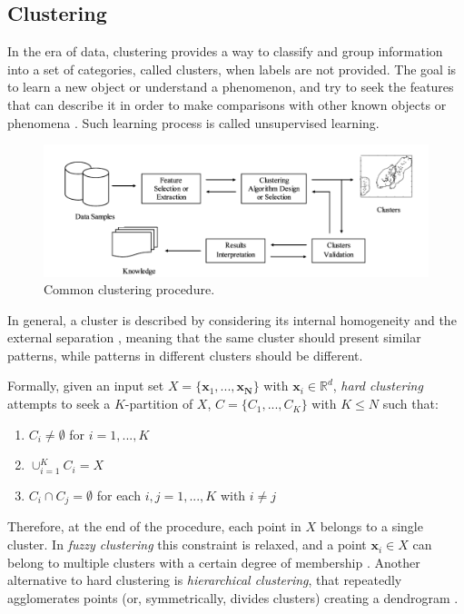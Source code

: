 \documentclass[a4paper, 12pt]{article} %
\begin{document}
	\subsection{Clustering } \label{ssec:clustering}
	In the era of data, clustering provides a way to classify and group information into a set of categories, called clusters, when labels are not provided. The goal is to learn a new object or understand a phenomenon, and try to seek the features that can describe it in order to make comparisons with other known objects or phenomena \cite{ClusteringSurvey}. Such learning process is called unsupervised learning.
	\begin{figure} 
		\includegraphics[width=\linewidth]{img/clustering_approach.png}
		\caption{Common clustering procedure.}
		\label{fig:clustering_approach}
	\end{figure}
	In general, a cluster is described by considering its internal homogeneity and the external separation \cite{ClusterHomogeinitySeparation}, meaning that the same cluster should present similar patterns, while patterns in different clusters should be different.
	
	Formally, given an input set $X = \{ \pmb{x}_1, ..., \pmb{x_N} \}$ with $\pmb{x}_i \in \mathbb{R}^d$, \textit{hard clustering} attempts to seek a $K$-partition of $X$, $C = \{ C_1, ..., C_K \}$ with $K \leq N$ such that:
	\begin{enumerate}
		 \item $C_i \neq \emptyset$ for $i = 1, ..., K$
		 \item $\cup_{i=1}^{K} C_i = X$
		 \item $C_i \cap C_j = \emptyset$ for each $i, j = 1, ..., K$ with $i \neq j$
	\end{enumerate}
	Therefore, at the end of the procedure, each point in $X$ belongs to a single cluster. In \textit{fuzzy clustering} this constraint is relaxed, and a point $\pmb{x}_i \in X$ can belong to multiple clusters with a certain degree of membership \cite{FuzzyClustering}. Another alternative to hard clustering is \textit{hierarchical clustering}, that repeatedly agglomerates points (or, symmetrically, divides clusters) creating a dendrogram \cite{HierarchicalClustering}.  
	
\end{document}
